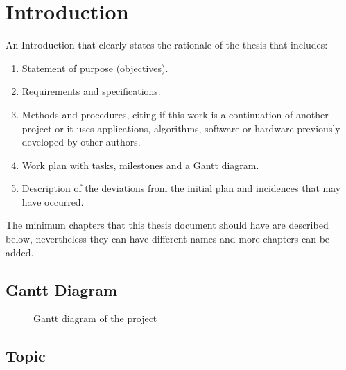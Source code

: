 \clearpage\section{Introduction}

{An Introduction that clearly states the rationale of the thesis that includes:}

\begin{enumerate}
\item {Statement of purpose (objectives).}
\item {Requirements and specifications.}
\item {Methods and procedures, citing if this work is a continuation of another project or it uses applications, algorithms,
software or hardware previously developed by other authors.}
\item {Work plan with tasks, milestones and a Gantt diagram.}

\item {Description of the deviations from the initial plan and incidences that may have occurred. }
\end{enumerate}

\bigskip

{The minimum chapters that this thesis document should have are described below, nevertheless they can have different
names and more chapters can be added.}


\bigskip

\subsection{Gantt Diagram}
\label{ssec:gantt}
\begin{figure}[H]
    \centering
    
    \caption[Project's Gantt diagram]{\footnotesize{Gantt diagram of the project}}
    \label{fig:gantt}
\end{figure}

\bigskip

\subsection{Topic}

